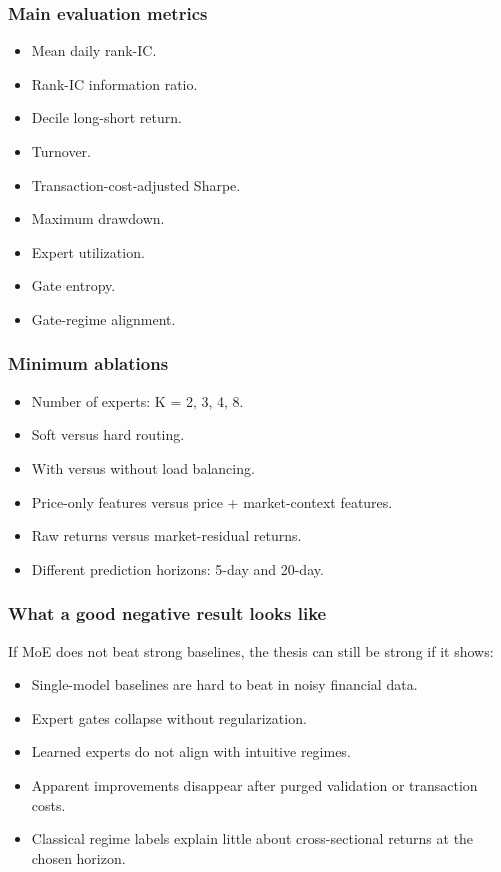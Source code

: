 \subsubsection{Main evaluation metrics}\label{main-evaluation-metrics}

\begin{itemize}
\tightlist
\item
  Mean daily rank-IC.
\item
  Rank-IC information ratio.
\item
  Decile long-short return.
\item
  Turnover.
\item
  Transaction-cost-adjusted Sharpe.
\item
  Maximum drawdown.
\item
  Expert utilization.
\item
  Gate entropy.
\item
  Gate-regime alignment.
\end{itemize}

\subsubsection{Minimum ablations}\label{minimum-ablations}

\begin{itemize}
\tightlist
\item
  Number of experts: K = 2, 3, 4, 8.
\item
  Soft versus hard routing.
\item
  With versus without load balancing.
\item
  Price-only features versus price + market-context features.
\item
  Raw returns versus market-residual returns.
\item
  Different prediction horizons: 5-day and 20-day.
\end{itemize}

\subsubsection{What a good negative result looks
like}\label{what-a-good-negative-result-looks-like}

If MoE does not beat strong baselines, the thesis can still be strong if
it shows:

\begin{itemize}
\tightlist
\item
  Single-model baselines are hard to beat in noisy financial data.
\item
  Expert gates collapse without regularization.
\item
  Learned experts do not align with intuitive regimes.
\item
  Apparent improvements disappear after purged validation or transaction
  costs.
\item
  Classical regime labels explain little about cross-sectional returns
  at the chosen horizon.
\end{itemize}


